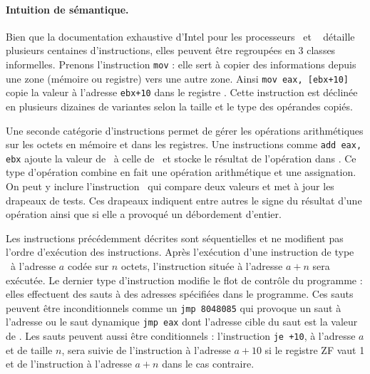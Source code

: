 \paragraph{Intuition de sémantique.}
Bien que la documentation exhaustive d'Intel pour les processeurs \xq\ et \xs\ \cite{intel_vol2} détaille plusieurs centaines d'instructions, elles peuvent être regroupées en 3 classes informelles.
Prenons l'instruction \texttt{mov} : elle sert à copier des informations depuis une zone (mémoire ou registre) vers une autre zone.
Ainsi \texttt{mov eax, [ebx+10]} copie la valeur à l'adresse \texttt{ebx+10} dans le registre \eax. 
Cette instruction est déclinée en plusieurs dizaines de variantes selon la taille et le type des opérandes copiés.

Une seconde catégorie d'instructions permet de gérer les opérations arithmétiques sur les octets en mémoire et dans les registres.
Une instructions comme \texttt{add eax, ebx} ajoute la valeur de \ebx\ à celle de \eax\ et stocke le résultat de l'opération dans \eax.
Ce type d'opération combine en fait une opération arithmétique et une assignation. 
On peut y inclure l'instruction \cmp\ qui compare deux valeurs et met à jour les drapeaux de tests. 
Ces drapeaux indiquent entre autres le signe du résultat d'une opération ainsi que si elle a provoqué un débordement d'entier.

Les instructions précédemment décrites sont séquentielles et ne modifient pas l'ordre d'exécution des instructions. 
Après l'exécution d'une instruction de type \mov\ à l'adresse $a$ codée sur $n$ octets, l'instruction située à l'adresse $a+n$ sera exécutée.
Le dernier type d'instruction modifie le flot de contrôle du programme : elles effectuent des sauts à des adresses spécifiées dans le programme.
Ces sauts peuvent être inconditionnels comme un \texttt{jmp 8048085} qui provoque un saut à l'adresse  ou le saut dynamique \texttt{jmp eax} dont l'adresse cible du saut est la valeur de \eax.
Les sauts peuvent aussi être conditionnels : l'instruction \texttt{je~+10}, à l'adresse $a$ et de taille $n$, sera suivie de l'instruction à l'adresse $a+10$ si le registre ZF vaut 1 et de l'instruction à l'adresse $a+n$ dans le cas contraire.



